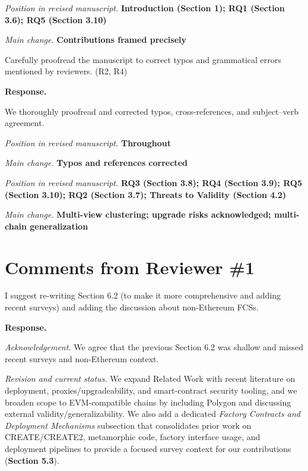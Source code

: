 \documentclass[acmsmall]{acmart}
\begin{document}
	\textit{Position in revised manuscript.} {\color{red}\textbf{Introduction (Section 1); RQ1 (Section 3.6); RQ5 (Section 3.10)}}

	\textit{Main change.} {\color{blue}\textbf{Contributions framed precisely}}

	\begin{tcolorbox}
		[commentbox,title=Editor/AE -- Comment 7.5] Carefully proofread the manuscript to correct
		typos and grammatical errors mentioned by reviewers. (R2, R4)
	\end{tcolorbox}

	\noindent
	\textbf{Response.}

	We thoroughly proofread and corrected typos, cross-references, and subject–verb agreement.

	\textit{Position in revised manuscript.} {\color{red}\textbf{Throughout}}

	\textit{Main change.} {\color{blue}\textbf{Typos and references corrected}}

	\vspace{0.25em}
	\textit{Position in revised manuscript.}
	{\color{red}\textbf{RQ3 (Section 3.8); RQ4 (Section 3.9); RQ5 (Section 3.10); RQ2 (Section 3.7); Threats to Validity (Section 4.2)}}

	\textit{Main change.}
	{\color{blue}\textbf{Multi-view clustering; upgrade risks acknowledged; multi-chain generalization}}

	\newpage
	\section{Comments from Reviewer \#1}

	\begin{tcolorbox}
		[commentbox,title=Reviewer \#1 -- Comment 1] I suggest re-writing Section 6.2 (to make it
		more comprehensive and adding recent surveys) and adding the discussion about non-Ethereum FCSs.
	\end{tcolorbox}

	\noindent
	\textbf{Response.}

	\textit{Acknowledgement.} We agree that the previous Section 6.2 was shallow and missed recent
	surveys and non-Ethereum context.

	\textit{Revision and current status.} We expand Related Work with recent literature on deployment,
	proxies/upgradeability, and smart-contract security tooling, and we broaden scope to EVM-compatible
	chains by including Polygon and discussing external validity/generalizability. We also add a dedicated
	\emph{Factory Contracts and Deployment Mechanisms} subsection that consolidates prior work on
	CREATE/CREATE2, metamorphic code, factory interface usage, and deployment pipelines to provide a
	focused survey context for our contributions (\textbf{Section 5.3}).
\end{document}
